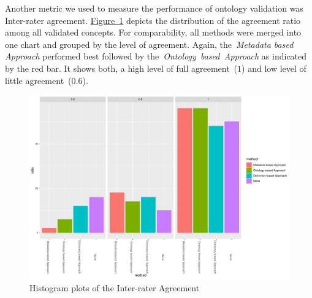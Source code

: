 Another metric we used to measure the performance of ontology validation was Inter-rater agreement. 
\hyperref[fig:hist_agreement_finance_all]{Figure~\ref*{fig:hist_agreement_finance_all}} depicts the distribution of the agreement ratio among all validated concepts. For comparability, all methods were merged into one chart and grouped by the level of agreement. Again, the~\emph{Metadata based Approach} performed best followed by the~\emph{Ontology~based~Approach} as indicated by the red bar. It shows both, a high level of full agreement~($1$) and low level of little agreement~($0.6$). 
\begin{figure}
  	 \includegraphics[width=\textwidth]{plots/finance/hist_agreement_corrected}
  	 \caption{Histogram plots of the Inter-rater Agreement}\label{fig:hist_agreement_finance_all}
\end{figure}
 
